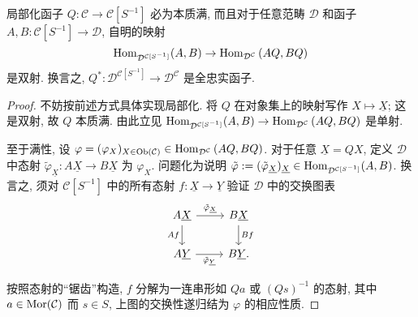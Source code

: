 \begin{proposition}\label{prop:localization-extra-property}
	局部化函子 $Q: \mathcal{C} \to \mathcal{C}[S^{-1}]$ 必为本质满, 而且对于任意范畴 $\mathcal{D}$ 和函子 $A, B: \mathcal{C}[S^{-1}] \to \mathcal{D}$, 自明的映射
	\[ \operatorname{Hom}_{\mathcal{D}^{\mathcal{C}[S^{-1}]}}(A, B) \to \operatorname{Hom}_{\mathcal{D}^{\mathcal{C}}}\left( AQ, BQ \right) \]
	是双射. 换言之, $Q^*: \mathcal{D}^{\mathcal{C}[S^{-1}]} \to \mathcal{D}^{\mathcal{C}}$ 是全忠实函子.
\end{proposition}
\begin{proof}
	不妨按前述方式具体实现局部化. 将 $Q$ 在对象集上的映射写作 $X \mapsto \underline{X}$; 这是双射, 故 $Q$ 本质满. 由此立见 $\operatorname{Hom}_{\mathcal{D}^{\mathcal{C}[S^{-1}]}}(A, B) \to \operatorname{Hom}_{\mathcal{D}^{\mathcal{C}}}\left( AQ, BQ \right)$ 是单射.
	
	至于满性, 设 $\varphi = (\varphi_X)_{X \in \operatorname{Ob}(\mathcal{C})} \in \operatorname{Hom}_{\mathcal{D}^{\mathcal{C}}}\left( AQ, BQ \right)$. 对于任意 $\underline{X} = QX$, 定义 $\mathcal{D}$ 中态射 $\tilde{\varphi}_{\underline{X}}: A\underline{X} \to B\underline{X}$ 为 $\varphi_X$. 问题化为说明 $\tilde{\varphi} := (\tilde{\varphi}_{\underline{X}})_{\underline{X}} \in \operatorname{Hom}_{\mathcal{D}^{\mathcal{C}[S^{-1}]}}(A, B)$. 换言之, 须对 $\mathcal{C}[S^{-1}]$ 中的所有态射 $f: \underline{X} \to \underline{Y}$ 验证 $\mathcal{D}$ 中的交换图表
	\[\begin{tikzcd}
		A\underline{X} \arrow[r, "{\tilde{\varphi}_{\underline{X}}}"] \arrow[d, "Af"'] & B\underline{X} \arrow[d, "Bf"] \\
		A\underline{Y} \arrow[r, "{\tilde{\varphi}_{\underline{Y}}}"'] & B\underline{Y} .
	\end{tikzcd}\]

	按照态射的``锯齿''构造, $f$ 分解为一连串形如 $Qa$ 或 $(Qs)^{-1}$ 的态射, 其中 $a \in \operatorname{Mor}(\mathcal{C})$ 而 $s \in S$, 上图的交换性遂归结为 $\varphi$ 的相应性质.
\end{proof}

